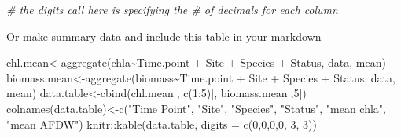 \documentclass[
]{article}
\newenvironment{Shaded}{\begin{snugshade}}{\end{snugshade}}
\newcommand{\AttributeTok}[1]{\textcolor[rgb]{0.77,0.63,0.00}{#1}}
\newcommand{\CommentTok}[1]{\textcolor[rgb]{0.56,0.35,0.01}{\textit{#1}}}
\newcommand{\DecValTok}[1]{\textcolor[rgb]{0.00,0.00,0.81}{#1}}
\newcommand{\FunctionTok}[1]{\textcolor[rgb]{0.00,0.00,0.00}{#1}}
\newcommand{\NormalTok}[1]{#1}
\newcommand{\OtherTok}[1]{\textcolor[rgb]{0.56,0.35,0.01}{#1}}
\newcommand{\SpecialCharTok}[1]{\textcolor[rgb]{0.00,0.00,0.00}{#1}}
\newcommand{\StringTok}[1]{\textcolor[rgb]{0.31,0.60,0.02}{#1}}
\begin{document}
\begin{Shaded}
\begin{Highlighting}[]
\CommentTok{\# the digits call here is specifying the \# of decimals for each column}
\end{Highlighting}
\end{Shaded}

Or make summary data and include this table in your markdown

\begin{Shaded}
\begin{Highlighting}[]
\NormalTok{chl.mean}\OtherTok{\textless{}{-}}\FunctionTok{aggregate}\NormalTok{(chla}\SpecialCharTok{\textasciitilde{}}\NormalTok{Time.point }\SpecialCharTok{+}\NormalTok{ Site }\SpecialCharTok{+}\NormalTok{ Species }\SpecialCharTok{+}\NormalTok{ Status, data, mean)}
\NormalTok{biomass.mean}\OtherTok{\textless{}{-}}\FunctionTok{aggregate}\NormalTok{(biomass}\SpecialCharTok{\textasciitilde{}}\NormalTok{Time.point }\SpecialCharTok{+}\NormalTok{ Site }\SpecialCharTok{+}\NormalTok{ Species }\SpecialCharTok{+}\NormalTok{ Status, data, mean)}
\NormalTok{data.table}\OtherTok{\textless{}{-}}\FunctionTok{cbind}\NormalTok{(chl.mean[, }\FunctionTok{c}\NormalTok{(}\DecValTok{1}\SpecialCharTok{:}\DecValTok{5}\NormalTok{)], biomass.mean[,}\DecValTok{5}\NormalTok{])}
\FunctionTok{colnames}\NormalTok{(data.table)}\OtherTok{\textless{}{-}}\FunctionTok{c}\NormalTok{(}\StringTok{"Time Point"}\NormalTok{, }\StringTok{"Site"}\NormalTok{, }\StringTok{"Species"}\NormalTok{, }\StringTok{"Status"}\NormalTok{, }\StringTok{"mean chla"}\NormalTok{, }\StringTok{"mean AFDW"}\NormalTok{)}
\NormalTok{knitr}\SpecialCharTok{::}\FunctionTok{kable}\NormalTok{(data.table, }\AttributeTok{digits =} \FunctionTok{c}\NormalTok{(}\DecValTok{0}\NormalTok{,}\DecValTok{0}\NormalTok{,}\DecValTok{0}\NormalTok{,}\DecValTok{0}\NormalTok{, }\DecValTok{3}\NormalTok{, }\DecValTok{3}\NormalTok{))}
\end{Highlighting}
\end{Shaded}
\end{document}
